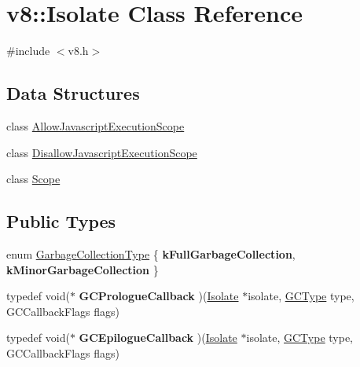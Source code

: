 \hypertarget{classv8_1_1Isolate}{\section{v8\-:\-:Isolate Class Reference}
\label{classv8_1_1Isolate}
}


{\ttfamily \#include $<$v8.\-h$>$}

\subsection*{Data Structures}
\begin{DoxyCompactItemize}
\item 
class \hyperlink{classv8_1_1Isolate_1_1AllowJavascriptExecutionScope}{Allow\-Javascript\-Execution\-Scope}
\item 
class \hyperlink{classv8_1_1Isolate_1_1DisallowJavascriptExecutionScope}{Disallow\-Javascript\-Execution\-Scope}
\item 
class \hyperlink{classv8_1_1Isolate_1_1Scope}{Scope}
\end{DoxyCompactItemize}
\subsection*{Public Types}
\begin{DoxyCompactItemize}
\item 
enum \hyperlink{classv8_1_1Isolate_a5ae00cc99d8aca148c6f5f9698c432c9}{Garbage\-Collection\-Type} \{ {\bfseries k\-Full\-Garbage\-Collection}, 
{\bfseries k\-Minor\-Garbage\-Collection}
 \}
\item 
\hypertarget{classv8_1_1Isolate_adf7f41783ab83baf8101df29b1e27c6d}{typedef void($\ast$ {\bfseries G\-C\-Prologue\-Callback} )(\hyperlink{classv8_1_1Isolate}{Isolate} $\ast$isolate, \hyperlink{namespacev8_ac109d6f27e0c0f9ef4e98bcf7a806cf2}{G\-C\-Type} type, G\-C\-Callback\-Flags flags)}\label{classv8_1_1Isolate_adf7f41783ab83baf8101df29b1e27c6d}

\item 
\hypertarget{classv8_1_1Isolate_ab2b33a74049adc3b771e83928514208e}{typedef void($\ast$ {\bfseries G\-C\-Epilogue\-Callback} )(\hyperlink{classv8_1_1Isolate}{Isolate} $\ast$isolate, \hyperlink{namespacev8_ac109d6f27e0c0f9ef4e98bcf7a806cf2}{G\-C\-Type} type, G\-C\-Callback\-Flags flags)}\label{classv8_1_1Isolate_ab2b33a74049adc3b771e83928514208e}

\end{DoxyCompactItemize}
